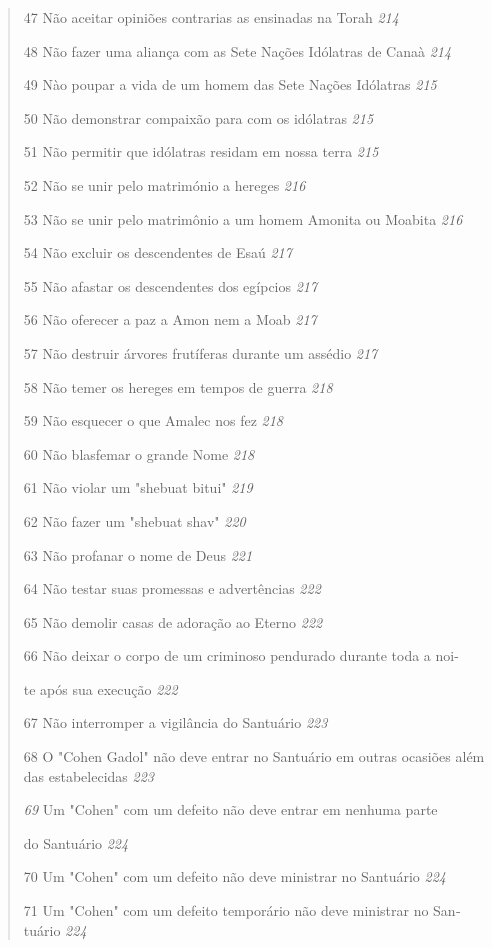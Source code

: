 \begin{quote}
47 Não aceitar opiniões contrarias as ensinadas na Torah \emph{214}

48 Não fazer uma aliança com as Sete Nações Idólatras de Canaà
\emph{214}

49 Nào poupar a vida de um homem das Sete Nações Idólatras \emph{215}

50 Não demonstrar compaixão para com os idólatras \emph{215}

51 Não permitir que idólatras residam em nossa terra \emph{215}

52 Não se unir pelo matrimónio a hereges \emph{216}

53 Não se unir pelo matrimônio a um homem Amonita ou Moabita \emph{216}

54 Não excluir os descendentes de Esaú \emph{217}

55 Não afastar os descendentes dos egípcios \emph{217}

56 Não oferecer a paz a Amon nem a Moab \emph{217}

57 Não destruir árvores frutíferas durante um assédio \emph{217}

58 Não temer os hereges em tempos de guerra \emph{218}

59 Não esquecer o que Amalec nos fez \emph{218}

60 Não blasfemar o grande Nome \emph{218}

61 Não violar um "shebuat bitui" \emph{219}

62 Não fazer um "shebuat shav" \emph{220}

63 Não profanar o nome de Deus \emph{221}

64 Não testar suas promessas e advertências \emph{222}

65 Não demolir casas de adoração ao Eterno \emph{222}

66 Não deixar o corpo de um criminoso pendurado durante toda a noi-

te após sua execução \emph{222}

67 Não interromper a vigilância do Santuário \emph{223}

68 O "Cohen Gadol" não deve entrar no Santuário em outras ocasiões além
das estabelecidas \emph{223}

\emph{69} Um "Cohen" com um defeito não deve entrar em nenhuma parte

do Santuário \emph{224}

70 Um "Cohen" com um defeito não deve ministrar no Santuário \emph{224}

71 Um "Cohen" com um defeito temporário não deve ministrar no San­tuário
\emph{224}
\end{quote}

